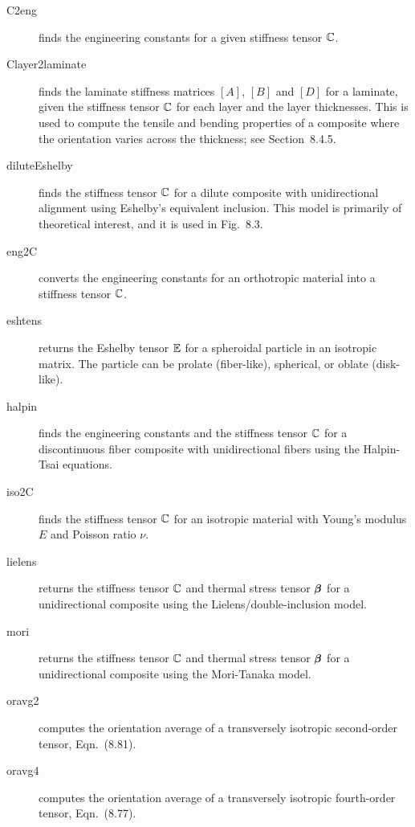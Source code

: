 \documentclass[11pt]{article}
\begin{document}
\begin{description}

    \item[C2eng]{finds the engineering constants for a given stiffness tensor $\mathbb{C}$.}

    \item[Clayer2laminate]{finds the laminate stiffness matrices $[A]$, $[B]$ and $[D]$ for a laminate, given the stiffness tensor $\mathbb{C}$ for each layer and the layer thicknesses.  This is used to compute the tensile and bending properties of a composite where the orientation varies across the thickness; see Section~8.4.5.}
    
    \item[diluteEshelby]{finds the stiffness tensor $\mathbb{C}$ for a dilute composite with unidirectional alignment using Eshelby's equivalent inclusion.  This model is primarily of theoretical interest, and it is used in Fig.~8.3.}    
    
    \item[eng2C]{converts the engineering constants for an orthotropic material into a stiffness tensor $\mathbb{C}$.}    
    
    \item[eshtens]{returns the Eshelby tensor $\mathbb{E}$ for a spheroidal particle in an isotropic matrix.  The particle can be prolate (fiber-like), spherical, or oblate (disk-like).}
    
    \item[halpin]{finds the engineering constants and the stiffness tensor $\mathbb{C}$ for a discontinuous fiber composite with unidirectional fibers using the Halpin-Tsai equations.}    
    
    \item[iso2C]{finds the stiffness tensor $\mathbb{C}$ for an isotropic material with Young's modulus $E$ and Poisson ratio $\nu$.}    
    
    \item[lielens]{returns the stiffness tensor $\mathbb{C}$ and thermal stress tensor $\boldsymbol{\beta}$ for a unidirectional composite using the Lielens/double-inclusion model.}    
    
    \item[mori]{returns the stiffness tensor $\mathbb{C}$ and thermal stress tensor $\boldsymbol{\beta}$ for a unidirectional composite using the Mori-Tanaka model.}   
    
    \item[oravg2]{computes the orientation average of a transversely isotropic second-order tensor, Eqn.~(8.81).}   
    
    \item[oravg4]{computes the orientation average of a transversely isotropic fourth-order tensor, Eqn.~(8.77).}   
    
\end{description}
\end{document}
